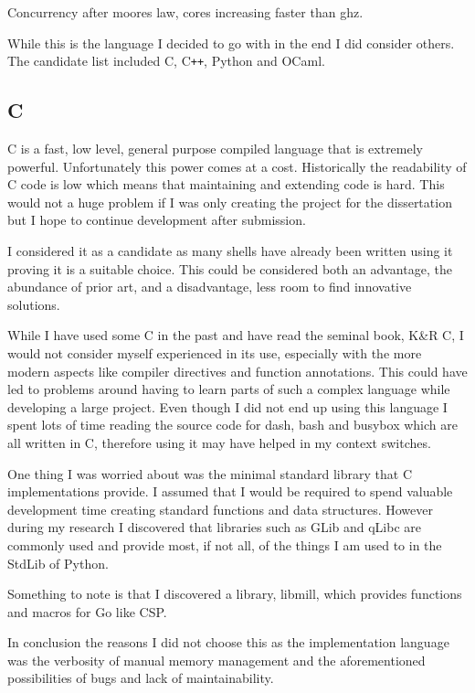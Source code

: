 Concurrency after moores law, cores increasing faster than ghz.

While this is the language I decided to go with in the end I did consider others.
The candidate list included C, C\verb!++!, Python and OCaml.

\subsection{C}
C is a fast, low level, general purpose compiled language that is extremely powerful.
Unfortunately this power comes at a cost.
Historically the readability of C code is low which means that maintaining and extending code is hard.
This would not a huge problem if I was only creating the project for the dissertation but I hope to continue development after submission.

I considered it as a candidate as many shells have already been written using it proving it is a suitable choice.
This could be considered both an advantage, the abundance of prior art, and a disadvantage, less room to find innovative solutions.

While I have used some C in the past and have read the seminal book, K\&R C, I would not consider myself experienced in its use, especially with the more modern aspects like compiler directives and function annotations.
This could have led to problems around having to learn parts of such a complex language while developing a large project.
Even though I did not end up using this language I spent lots of time reading the source code for dash, bash and busybox which are all written in C, therefore using it  may have helped in my context switches. 

One thing I was worried about was the minimal standard library that C implementations provide.
I assumed that I would be required to spend valuable development time creating standard functions and data structures.
However during my research I discovered that libraries such as GLib and qLibc are commonly used and provide most, if not all, of the things I am used to in the StdLib of Python.

Something to note is that I discovered a library, libmill\cite{LIBMILL}, which provides functions and macros for Go like CSP.

In conclusion the reasons I did not choose this as the implementation language was the verbosity of manual memory management and the aforementioned possibilities of bugs and lack of maintainability. 


